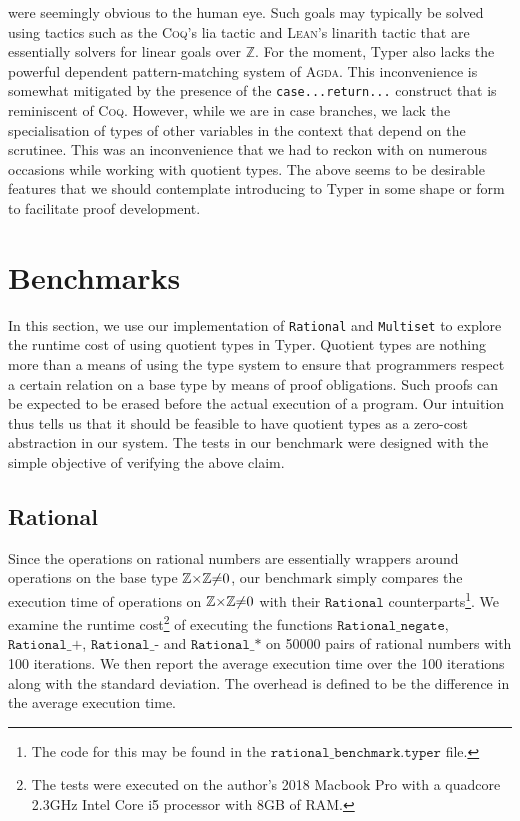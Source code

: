 \documentclass[12pt,twoside,maitrise]{dms}
\theoremstyle{definition}
\numberwithin{equation}{section}
\numberwithin{table}{chapter}
\numberwithin{figure}{chapter}
\newcommand\kw[1] {\textsf{#1}}
\newcommand\id[1] {\texttt{#1}}
\newcommand\fn[1] {\texttt{#1}}
\def\Coq{\textsc{Coq}\xspace}
\def\Agda{\textsc{Agda}\xspace}
\def\Lean{\textsc{Lean}\xspace}
\begin{document}
were seemingly obvious to the human eye. Such goals may typically be solved
using tactics such as the \Coq{}'s \kw{lia} tactic and \Lean{}'s \kw{linarith}
tactic that are essentially solvers for linear goals over $\mathbb{Z}$. For the
moment, Typer also lacks the powerful dependent pattern-matching system of
\Agda{}. This inconvenience is somewhat mitigated by the presence of the
\fn{\kw{case}...\kw{return}...} construct that is
reminiscent of \Coq{}. However, while we are in \kw{case} branches, we lack the
specialisation of types of other variables in the context that depend on the
scrutinee. This was an inconvenience that we had to reckon with on numerous
occasions while working with quotient types. The above seems to be desirable
features that we should contemplate introducing to Typer in some shape or form
to facilitate proof development.

\section*{Benchmarks}\label{sec:quot-benchmark}

In this section, we use our implementation of \id{Rational} and \id{Multiset} to
explore the runtime cost of using quotient types in Typer. Quotient types are
nothing more than a means of using the type system to ensure that programmers
respect a certain relation on a base type by means of proof obligations. Such
proofs can be expected to be erased before the actual execution of a program.
Our intuition thus tells us that it should be feasible to have quotient types as
a zero-cost abstraction in our system. The tests in our benchmark were designed
with the simple objective of verifying the above claim.

\subsection*{Rational}

Since the operations on rational numbers are essentially wrappers around
operations on the base type $\mathbb{Z}{\times}\mathbb{Z}{\ne}0$, our benchmark simply compares the
execution time of operations on $\mathbb{Z}{\times}\mathbb{Z}{\ne}0$ with their $\fn{Rational}$
counterparts\footnote{The code for this may be found in the
$\fn{rational\_benchmark.typer}$ file.}. We examine the runtime
cost\footnote{The tests were executed on the author's 2018 Macbook Pro with a
quadcore 2.3GHz Intel Core i5 processor with 8GB of RAM.} of executing the
functions $\fn{Rational\_negate}$, $\fn{Rational\_+}$, $\fn{Rational\_-}$ and
$\fn{Rational\_*}$ on 50000 pairs of rational numbers with 100 iterations. We
then report the average execution time over the 100 iterations along with the
standard deviation. The overhead is defined to be the difference in the average
execution time.
\end{document}
